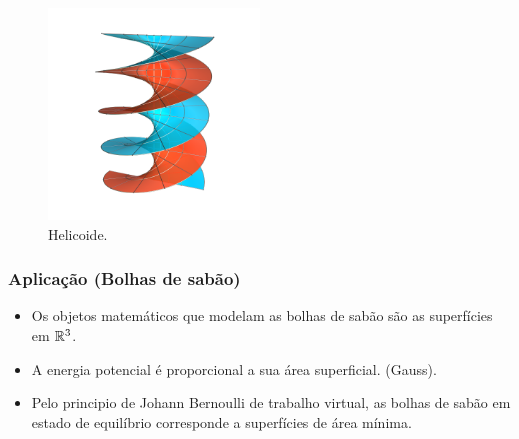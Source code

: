 \documentclass[12pt,a4paper]{beamer}
\theoremstyle{definition}
\begin{document}
\begin{frame}
	
	\begin{figure}
		\centering
		\includegraphics[width=0.5\textwidth]{images/helicoid}
		\caption{Helicoide.}
	\end{figure}
\end{frame}

\begin{frame}
	\frametitle{Aplicação (Bolhas de sabão)}
	
	\begin{itemize}
		\item Os objetos matemáticos que modelam as bolhas de sabão são as superfícies em $\mathbb R^3$.
		\pause
		\item A energia potencial é proporcional a sua área superficial. (Gauss).
		\pause
		\item Pelo principio de Johann Bernoulli de trabalho virtual, as bolhas de sabão em estado de equilíbrio corresponde a superfícies de área mínima.
	\end{itemize}
	
	
\end{frame}
\end{document}
